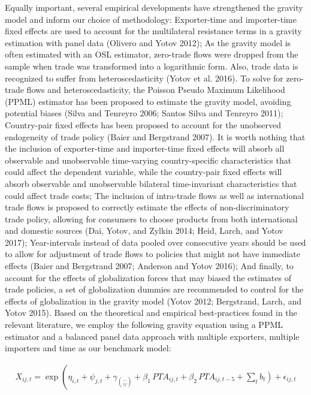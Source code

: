 Equally important, several empirical developments have strengthened the
gravity model and inform our choice of methodology: Exporter-time and
importer-time fixed effects are used to account for the multilateral
resistance terms in a gravity estimation with panel data (Olivero and
Yotov 2012); As the gravity model is often estimated with an OSL
estimator, zero-trade flows were dropped from the sample when trade was
transformed into a logarithmic form. Also, trade data is recognized to
suffer from heteroscedasticity (Yotov et al. 2016). To solve for
zero-trade flows and heteroscedasticity, the Poisson Pseudo Maximum
Likelihood (PPML) estimator has been proposed to estimate the gravity
model, avoiding potential biases (Silva and Tenreyro 2006; Santos Silva
and Tenreyro 2011); Country-pair fixed effects has been proposed to
account for the unobserved endogeneity of trade policy (Baier and
Bergstrand 2007). It is worth nothing that the inclusion of
exporter-time and importer-time fixed effects will absorb all observable
and unobservable time-varying country-specific characteristics that
could affect the dependent variable, while the country-pair fixed
effects will absorb observable and unobservable bilateral time-invariant
characteristics that could affect trade costs; The inclusion of
intra-trade flows as well as international trade flows is proposed to
correctly estimate the effects of non-discriminatory trade policy,
allowing for consumers to choose products from both international and
domestic sources (Dai, Yotov, and Zylkin 2014; Heid, Larch, and Yotov
2017); Year-intervals instead of data pooled over consecutive years
should be used to allow for adjustment of trade flows to policies that
might not have immediate effects (Baier and Bergstrand 2007; Anderson
and Yotov 2016); And finally, to account for the effects of
globalization forces that may biased the estimates of trade policies, a
set of globalization dummies are recommended to control for the effects
of globalization in the gravity model (Yotov 2012; Bergstrand, Larch,
and Yotov 2015). Based on the theoretical and empirical best-practices
found in the relevant literature, we employ the following gravity
equation using a PPML estimator and a balanced panel data approach with
multiple exporters, multiple importers and time as our benchmark model:

\begin{multline}
    X_{ij,t} = \exp\left(\eta_{i,t} + \psi_{j,t} + \gamma_{\binom{-}{ij}} + \beta_{1} \, PTA_{ij,t} \right. + \beta_{2} \, PTA_{ij,t-5} + \left. \sum_{t} b_{t} \right) + \epsilon_{ij,t}
\end{multline}

